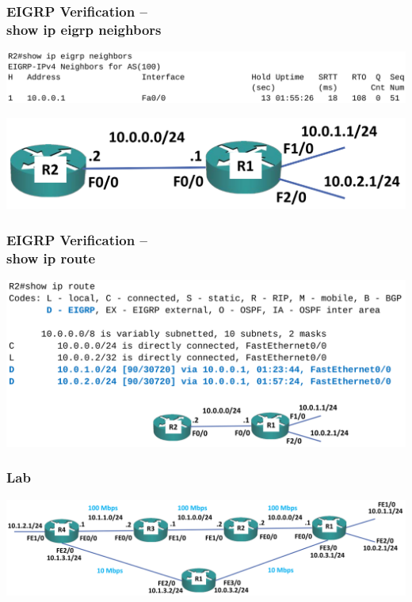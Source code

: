 \documentclass[pdflatex,compress,mathserif]{beamer}
\begin{document}
\begin{frame}
	\frametitle{EIGRP Verification –\\ show ip eigrp neighbors}
	\begin{center}
		\includegraphics[width=\linewidth]{img/img26}
	\end{center}
	\begin{center}
		\includegraphics[width=0.5\linewidth]{img/img27}
	\end{center}
\end{frame}

\begin{frame}
	\frametitle{EIGRP Verification –\\ show ip route}
	\begin{center}
		\includegraphics[width=\linewidth]{img/img28}
	\end{center}
\end{frame}

\begin{frame}
	\frametitle{Lab}
	\begin{center}
		\includegraphics[width=\linewidth]{img/img29}
	\end{center}
\end{frame}
\end{document}
